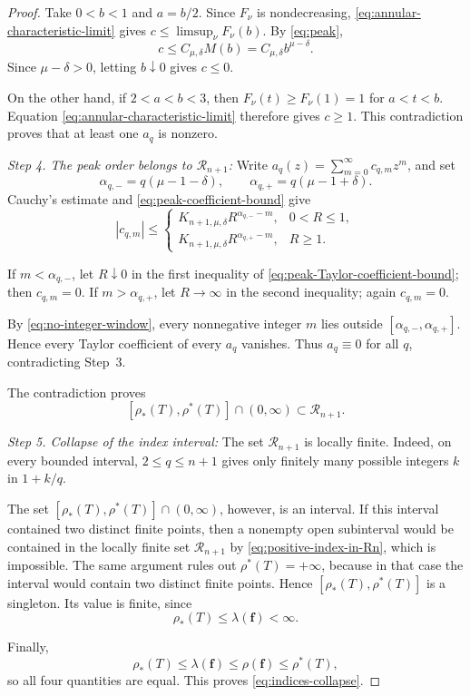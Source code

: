 \documentclass[12pt,letterpaper,reqno]{amsart}
\theoremstyle{definition}
\numberwithin{equation}{section}
\newcommand{\Gn}{\mathcal R_{n+1}}
\newcommand{\fv}{\bm f}
\begin{document}
\begin{proof}
Take \(0<b<1\) and \(a=b/2\). Since \(F_\nu\) is nondecreasing,
\eqref{eq:annular-characteristic-limit} gives
\(c\leq\limsup_\nu F_\nu(b)\). By \eqref{eq:peak},
\[
c
\leq
C_{\mu,\delta}M(b)
=
C_{\mu,\delta}b^{\mu-\delta}.
\]
Since \(\mu-\delta>0\), letting \(b\downarrow0\) gives \(c\leq0\).

On the other hand, if \(2<a<b<3\), then
\(F_\nu(t)\geq F_\nu(1)=1\) for \(a<t<b\). Equation
\eqref{eq:annular-characteristic-limit} therefore gives \(c\geq1\).
This contradiction proves that at least one \(a_q\) is nonzero.


\medskip\noindent
\emph{{Step 4. The peak order belongs to \(\Gn\):}}
Write
\(a_q(z)=\sum_{m=0}^{\infty}c_{q,m}z^m\), and set
\[
\alpha_{q,-}=q(\mu-1-\delta),
\qquad
\alpha_{q,+}=q(\mu-1+\delta).
\]
Cauchy's estimate and \eqref{eq:peak-coefficient-bound} give
\begin{equation}\label{eq:peak-Taylor-coefficient-bound}
 |c_{q,m}|
 \leq
 \begin{cases}
 K_{n+1,\mu,\delta}R^{\alpha_{q,-}-m},
     &0<R\leq1,\\[2mm]
 K_{n+1,\mu,\delta}R^{\alpha_{q,+}-m},
     &R\geq1.
 \end{cases}
\end{equation}

If \(m<\alpha_{q,-}\), let \(R\downarrow0\) in the first inequality
of \eqref{eq:peak-Taylor-coefficient-bound}; then \(c_{q,m}=0\).
If \(m>\alpha_{q,+}\), let \(R\to\infty\) in the second inequality;
again \(c_{q,m}=0\).

By \eqref{eq:no-integer-window}, every nonnegative integer \(m\) lies
outside
\([\alpha_{q,-},\alpha_{q,+}]\). Hence every Taylor coefficient of
every \(a_q\) vanishes. Thus \(a_q\equiv0\) for all \(q\), contradicting
Step~3.

The contradiction proves
\begin{equation}\label{eq:positive-index-in-Rn}
 [\rho_*(T),\rho^*(T)]
 \cap(0,\infty)
 \subset\Gn.
\end{equation}


\medskip\noindent
\emph{{Step 5. Collapse of the index interval:}}
The set \(\Gn\) is locally finite. Indeed, on every bounded interval,
\(2\leq q\leq n+1\) gives only finitely many possible integers \(k\) in
\(1+k/q\).

The set
\([\rho_*(T),\rho^*(T)]\cap(0,\infty)\), however, is an interval.
If this interval contained two distinct finite points, then a nonempty
open subinterval would be contained in the locally finite set \(\Gn\) by
\eqref{eq:positive-index-in-Rn}, which is impossible. The same argument
rules out \(\rho^*(T)=+\infty\), because in that case the interval would
contain two distinct finite points. Hence
\([\rho_*(T),\rho^*(T)]\) is a singleton. Its value is finite, since
\[
\rho_*(T)\leq\lambda(\fv)<\infty.
\]

Finally,
\[
\rho_*(T)
\leq
\lambda(\fv)
\leq
\rho(\fv)
\leq
\rho^*(T),
\]
so all four quantities are equal. This proves
\eqref{eq:indices-collapse}.
\end{proof}
\end{document}
